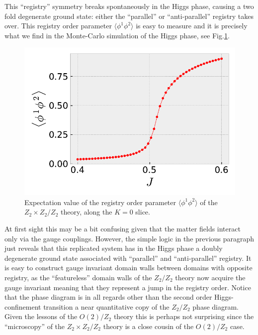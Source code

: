 This ``registry'' symmetry breaks spontaneously in the Higgs phase, causing a two fold degenerate ground state: either the ``parallel'' or ``anti-parallel'' registry takes over. This registry order parameter $\langle \phi^1\phi^2\rangle$ is easy to measure and it is precisely what we find in the Monte-Carlo simulation of the Higgs phase, see Fig.\ref{Z2xZ2Z2orderParameter}.
\begin{figure}[!h]
	\centering
	\includegraphics[scale=.7]{figures/chapter2/orderParameterZ2xZ2Z2K0.pdf}
	\caption{Expectation value of the registry order parameter $\langle \phi^1\phi^2\rangle$ of the  $Z_2 \times Z_2 / Z_2$ theory, along the $K=0$ slice.} 
	\label{Z2xZ2Z2orderParameter}
\end{figure}

At first sight this may be a bit confusing given that the matter fields interact only via the gauge couplings. However, the simple logic in the previous paragraph just reveals that this replicated system has in the Higgs phase a doubly degenerate ground state associated with ``parallel'' and ``anti-parallel'' registry. It is easy to construct gauge invariant domain walls between domains with opposite registry, as the ``featureless'' domain walls of the $Z_2/Z_2$ theory now acquire the gauge invariant meaning that they represent a jump in the registry order. Notice that the phase diagram is in all regards other than the second order  Higgs-confinement transition a near quantitative copy of the $Z_2/Z_2$ phase diagram. Given the lessons of the $O(2)/Z_2$ theory this is perhaps not surprising since the ``microscopy'' of the $Z_2 \times Z_2 / Z_2$ theory is a close cousin of the  $O(2)/Z_2$ case.  

